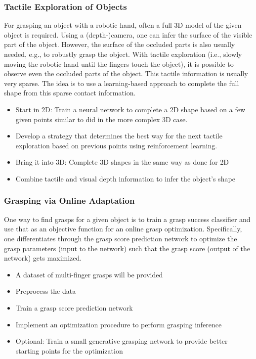 \documentclass[a4paper]{article}
\begin{document}
\subsubsection{Tactile Exploration of Objects}
For grasping an object with a robotic hand, often a full 3D model of the given object is required.
Using a (depth-)camera, one can infer the surface of the visible part of the object. However, the surface of the occluded parts is also usually needed, e.g., to robustly grasp the object.
With tactile exploration (i.e., slowly moving the robotic hand until the fingers touch the object), it is possible to observe even the occluded parts of the object.
This tactile information is usually very sparse. The idea is to use a learning-based approach to complete the full shape from this sparse contact information.

\begin{itemize}
  \item Start in 2D: Train a neural network to complete a 2D shape based on a few given points similar to \citet{Watkins2019multi} did in the more complex 3D case.
  \item Develop a strategy that determines the best way for the next tactile exploration based on previous points using reinforcement learning.
  \item Bring it into 3D: Complete 3D shapes in the same way as done for 2D
  \item Combine tactile and visual depth information to infer the object's shape
\end{itemize}



\subsubsection{Grasping via Online Adaptation}
One way to find grasps for a given object is to train a grasp success classifier and use that as an objective function for an online grasp optimization.
Specifically, one differentiates through the grasp score prediction network to optimize the grasp parameters (input to the network) such that the grasp score (output of the network) gets maximized.

\begin{itemize}
  \item A dataset of multi-finger grasps will be provided~\cite{Winkelbauer2022}
  \item Preprocess the data
  \item Train a grasp score prediction network~\cite{Van2020learning}
  \item Implement an optimization procedure to perform grasping inference
  \item Optional: Train a small generative grasping network to provide better starting points for the optimization
\end{itemize}
\end{document}
